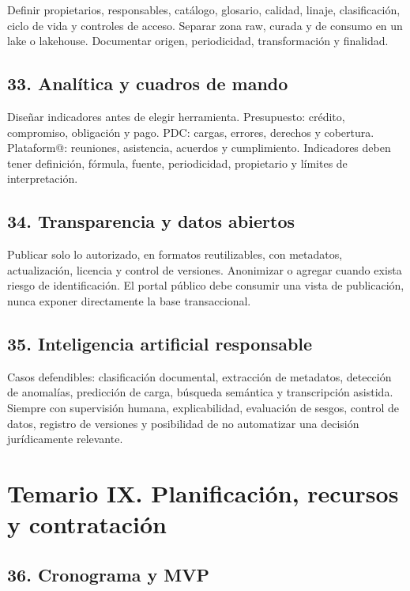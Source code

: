 \documentclass[11pt,a4paper]{article}
\begin{document}
Definir propietarios, responsables, catálogo, glosario, calidad, linaje, clasificación, ciclo de vida y controles de acceso. Separar zona raw, curada y de consumo en un lake o lakehouse. Documentar origen, periodicidad, transformación y finalidad.

\subsection{33. Analítica y cuadros de mando}

Diseñar indicadores antes de elegir herramienta. Presupuesto: crédito, compromiso, obligación y pago. PDC: cargas, errores, derechos y cobertura. Plataform@: reuniones, asistencia, acuerdos y cumplimiento. Indicadores deben tener definición, fórmula, fuente, periodicidad, propietario y límites de interpretación.

\subsection{34. Transparencia y datos abiertos}

Publicar solo lo autorizado, en formatos reutilizables, con metadatos, actualización, licencia y control de versiones. Anonimizar o agregar cuando exista riesgo de identificación. El portal público debe consumir una vista de publicación, nunca exponer directamente la base transaccional.

\subsection{35. Inteligencia artificial responsable}

Casos defendibles: clasificación documental, extracción de metadatos, detección de anomalías, predicción de carga, búsqueda semántica y transcripción asistida. Siempre con supervisión humana, explicabilidad, evaluación de sesgos, control de datos, registro de versiones y posibilidad de no automatizar una decisión jurídicamente relevante.

\section{Temario IX. Planificación, recursos y contratación}

\subsection{36. Cronograma y MVP}
\end{document}
